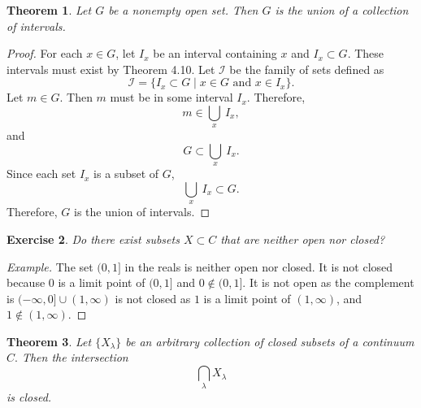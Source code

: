 \documentclass{amsart}
\newtheorem{theorem}{Theorem}
\newtheorem{exercise}[theorem]{Exercise}
\newcommand{\1}{\mathds{1}}
\numberwithin{equation}{section}
\numberwithin{theorem}{section}
\begin{document}
\begin{theorem}\label{union}  Let $G$ be a nonempty open set.  Then $G$ is the union of a collection of intervals.  
\end{theorem}

\begin{proof}
	For each $x\in G$, let $I_x$ be an interval containing $x$ and $I_x\subset G$. These intervals must exist by Theorem 4.10. Let $\mathcal{I}$ be the family of sets defined as $$\mathcal{I} = \{I_x \subset G\mid x\in G \text{ and } x\in I_x\}.$$ Let $m\in G$. Then $m$ must be in some interval $I_x$. Therefore, $$m\in \bigcup_x \ I_x,$$ and $$G\subset \bigcup_x \ I_x.$$ Since each set $I_x$ is a subset of $G$, $$\bigcup_x \ I_x \subset G.$$ Therefore, $G$ is the union of intervals. 
\end{proof}

\begin{exercise}  Do there exist subsets $X \subset C$ that are neither open nor closed?
\end{exercise}

\begin{proof}[Example]
	The set $(0,1]$ in the reals is neither open nor closed. It is not closed because $0$ is a limit point of $(0,1]$ and $0\notin (0,1]$. It is not open as the complement is $(-\infty,0] \cup (1,\infty)$ is not closed as $1$ is a limit point of $(1,\infty)$, and $1\notin (1,\infty)$.
\end{proof}

\begin{theorem}  Let $\{X_{\lambda} \}$ be an arbitrary collection of closed subsets of a continuum $C.$  Then the intersection
\[
	\bigcap_{\lambda} X_{\lambda}
\]
is closed.
\end{theorem}
\end{document}
